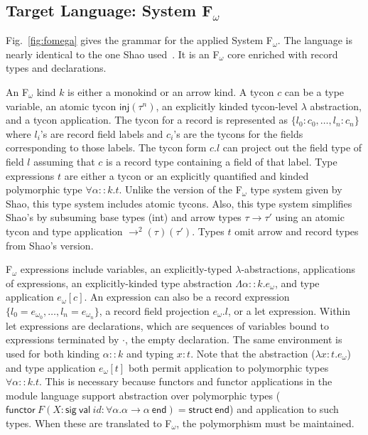 \documentclass[9pt,nocopyrightspace, fleqn]{sigplanconf}
\begin{document}
\subsection{Target Language: System F$_\omega$}
Fig.~\ref{fig:fomega} gives the grammar for the applied
System F$_\omega$. The language is nearly identical to the one Shao
used~\cite{shao98}. It is an F$_\omega$ core enriched with record
types and declarations. 

An F$_\omega$ kind $k$ is either a monokind or an arrow kind. A tycon
$c$ can be a type variable, an atomic tycon $\mathsf{inj}(\tau^n)$, an
explicitly kinded tycon-level $\lambda$ abstraction, and a tycon
application. The tycon for a record is represented as
$\{l_0 : c_0,\ldots,l_n : c_n\}$ where $l_i$'s are record field labels and
$c_i$'s are the tycons for the fields corresponding to those
labels. The tycon form $c.l$ can project out the field type of field
$l$ assuming that $c$ is a record type containing a field of that
label. Type expressions $t$ are either a tycon or an explicitly quantified
and kinded polymorphic type $\forall\alpha::k.t$. Unlike the version of
the F$_\omega$ type system given by Shao, this type
system includes atomic tycons. Also, this type system simplifies
Shao's by subsuming base types (int) and arrow types $\tau\to\tau'$ using an atomic tycon
and type application $\to^2(\tau)(\tau')$. Types $t$ omit arrow and
record types from Shao's version. 

F$_\omega$ expressions include variables, an explicitly-typed
$\lambda$-abstractions, applications of expressions, an explicitly-kinded type
abstraction $\Lambda\alpha::k.e_\omega$, and type application
$e_\omega[c]$. An expression can also be a record expression
$\{l_0=e_{\omega_0},\ldots,l_n=e_{\omega_n}\}$, a record field
projection $e_\omega.l$, or a let expression. Within let expressions
are declarations, which are sequences of variables bound to
expressions terminated by $\cdot$, the empty declaration. The same
environment is used for both kinding $\alpha::k$ and typing $x:t$. Note that the
abstraction ($\lambda x:t.e_\omega$) and type application
$e_{\omega}[t]$ both permit application to polymorphic types
$\forall\alpha::k.t$. This is necessary because functors and
functor applications in the module language support abstraction over
polymorphic types ($\mathsf{functor}~F(X:\mathsf{sig~val}~id :
\forall\alpha.\alpha\to\alpha~\mathsf{end})=\mathsf{struct~end}$) and
application to such types. When these are translated to F$_\omega$,
the polymorphism must be maintained. 
\end{document}
